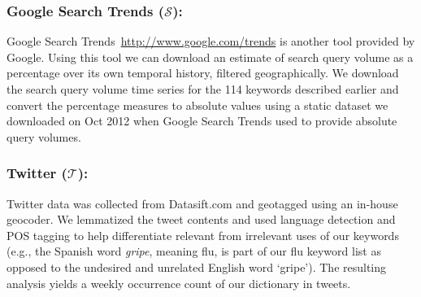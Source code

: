 \subsubsection{Google Search Trends ($\mathcal{S}$):} 
Google Search Trends~\url{http://www.google.com/trends} is
another tool provided by Google. Using this tool we can download an estimate of
search query volume as a percentage over its own temporal history, filtered
geographically. We download
the search query volume time series for the 114 keywords described earlier
and convert the percentage measures to
absolute values using a static dataset we downloaded on Oct 2012 when Google
Search Trends used to provide absolute query volumes. 

\subsubsection{Twitter ($\mathcal{T}$):} 
Twitter data was collected from Datasift.com
and geotagged using an in-house geocoder. We lemmatized the tweet
contents and used language detection and POS tagging to help differentiate relevant
from irrelevant uses of our keywords 
(e.g., the Spanish word
{\it gripe}, meaning flu, is part of our flu keyword list as opposed to the undesired
and unrelated English word `gripe'). The resulting analysis yields a weekly occurrence
count of our dictionary in tweets.
%

